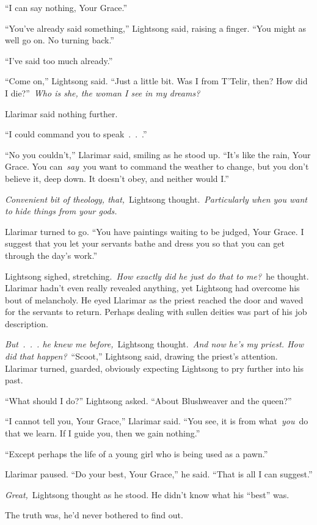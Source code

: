 “I can say nothing, Your Grace.”

“You’ve already said something,” Lightsong said, raising a finger. “You might as well go on. No turning back.”

“I’ve said too much already.”

“Come on,” Lightsong said. “Just a little bit. Was I from T’Telir, then? How did I die?”~\textit{Who is she, the woman I see in my dreams?}

Llarimar said nothing further.

“I could command you to speak~.~.~.”

“No you couldn’t,” Llarimar said, smiling as he stood up. “It’s like the rain, Your Grace. You can~\textit{say}~you want to command the weather to change, but you don’t believe it, deep down. It doesn’t obey, and neither would I.”

\textit{Convenient bit of theology, that,}~Lightsong thought.~\textit{Particularly when you want to hide things from your gods.}

Llarimar turned to go. “You have paintings waiting to be judged, Your Grace. I suggest that you let your servants bathe and dress you so that you can get through the day’s work.”

Lightsong sighed, stretching.~\textit{How exactly did he just do that to me?}~he thought. Llarimar hadn’t even really revealed anything, yet Lightsong had overcome his bout of melancholy. He eyed Llarimar as the priest reached the door and waved for the servants to return. Perhaps dealing with sullen deities was part of his job description.

\textit{But~.~.~. he knew me before,}~Lightsong thought.~\textit{And now he’s my priest. How did that happen?}~“Scoot,” Lightsong said, drawing the priest’s attention. Llarimar turned, guarded, obviously expecting Lightsong to pry further into his past.

“What should I do?” Lightsong asked. “About Blushweaver and the queen?”

“I cannot tell you, Your Grace,” Llarimar said. “You see, it is from what~\textit{you}~do that we learn. If I guide you, then we gain nothing.”

“Except perhaps the life of a young girl who is being used as a pawn.”

Llarimar paused. “Do your best, Your Grace,” he said. “That is all I can suggest.”

\textit{Great,}~Lightsong thought as he stood. He didn’t know what his “best” was.

The truth was, he’d never bothered to find out.

